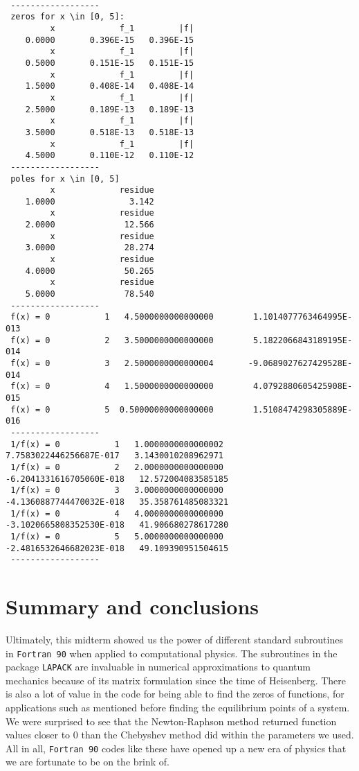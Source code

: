 \documentclass[12pt]{article}
\begin{document}
\begin{lstlisting}[frame=single,caption={Output of {\tt Fortran 90} Code {\tt zeros.f90}},label=out21]

 ------------------
 zeros for x \in [0, 5]:
         x             f_1         |f|
    0.0000       0.396E-15   0.396E-15
         x             f_1         |f|
    0.5000       0.151E-15   0.151E-15
         x             f_1         |f|
    1.5000       0.408E-14   0.408E-14
         x             f_1         |f|
    2.5000       0.189E-13   0.189E-13
         x             f_1         |f|
    3.5000       0.518E-13   0.518E-13
         x             f_1         |f|
    4.5000       0.110E-12   0.110E-12
 ------------------
 poles for x \in [0, 5]
         x             residue
    1.0000               3.142
         x             residue
    2.0000              12.566
         x             residue
    3.0000              28.274
         x             residue
    4.0000              50.265
         x             residue
    5.0000              78.540
 ------------------
 f(x) = 0           1   4.5000000000000000        1.1014077763464995E-013
 f(x) = 0           2   3.5000000000000000        5.1822066843189195E-014
 f(x) = 0           3   2.5000000000000004       -9.0689027627429528E-014
 f(x) = 0           4   1.5000000000000000        4.0792880605425908E-015
 f(x) = 0           5  0.50000000000000000        1.5108474298305889E-016
 ------------------
 1/f(x) = 0           1   1.0000000000000002        7.7583022446256687E-017   3.1430010208962971     
 1/f(x) = 0           2   2.0000000000000000       -6.2041331616705060E-018   12.572004083585185     
 1/f(x) = 0           3   3.0000000000000000       -4.1360887744470032E-018   35.358761485083321     
 1/f(x) = 0           4   4.0000000000000000       -3.1020665808352530E-018   41.906680278617280     
 1/f(x) = 0           5   5.0000000000000000       -2.4816532646682023E-018   49.109390951504615     
 ------------------

\end{lstlisting}

\section{Summary and conclusions}

Ultimately, this midterm showed us the power of different standard subroutines in {\tt Fortran 90} when applied to computational physics.  The subroutines in the package {\tt LAPACK} are invaluable in numerical approximations to quantum mechanics because of its matrix formulation since the time of Heisenberg.  There is also a lot of value in the code for being able to find the zeros of functions, for applications such as mentioned before finding the equilibrium points of a system.  We were surprised to see that the Newton-Raphson method returned function values closer to 0 than the Chebyshev method did within the parameters we used.  All in all, {\tt Fortran 90} codes like these have opened up a new era of physics that we are fortunate to be on the brink of.
\end{document}
